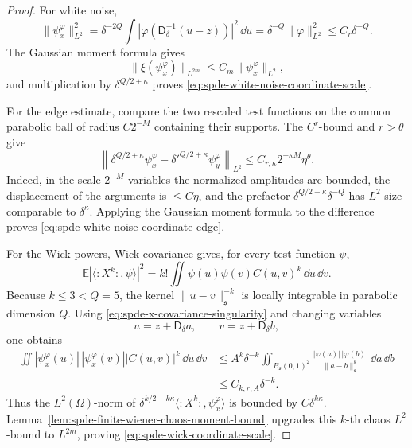 \begin{proof}
For white noise,
\[
  \|\psi_x^\varphi\|_{L^2}^2
  =
  \delta^{-2Q}\int
  \left|\varphi(\mathsf D_{\delta}^{-1}(u-z))\right|^2\,\dd u
  =
  \delta^{-Q}\|\varphi\|_{L^2}^2
  \leq C_r\delta^{-Q}.
\]
The Gaussian moment formula gives
\[
  \|\xi(\psi_x^\varphi)\|_{L^{2m}}
  \leq C_m\|\psi_x^\varphi\|_{L^2},
\]
and multiplication by \(\delta^{Q/2+\kappa}\) proves
\eqref{eq:spde-white-noise-coordinate-scale}.

For the edge estimate, compare the two rescaled test functions on the common
parabolic ball of radius \(C2^{-M}\) containing their supports.  The
\(C^r\)-bound and \(r>\theta\) give
\begin{equation}
  \left\|
    \delta^{Q/2+\kappa}\psi_x^\varphi
    -
    {\delta'}^{Q/2+\kappa}\psi_y^\varphi
  \right\|_{L^2}
  \leq
  C_{r,\kappa}2^{-\kappa M}\eta^\theta .
  \label{eq:spde-white-noise-edge-ltwo}
\end{equation}
Indeed, in the scale \(2^{-M}\) variables the normalized amplitudes are
bounded, the displacement of the arguments is \(\leq C\eta\), and the
prefactor \(\delta^{Q/2+\kappa}\delta^{-Q}\) has \(L^2\)-size comparable to
\(\delta^\kappa\).  Applying the Gaussian moment formula to the difference
proves \eqref{eq:spde-white-noise-coordinate-edge}.

For the Wick powers, Wick covariance gives, for every test function \(\psi\),
\begin{equation}
  \mathbb E
  \left|
    \langle :X^k:,\psi\rangle
  \right|^2
  =
  k!
  \iint
  \psi(u)\psi(v)C(u,v)^k\,\dd u\,\dd v .
  \label{eq:spde-wick-coordinate-covariance}
\end{equation}
Because \(k\leq3<Q=5\), the kernel
\(\|u-v\|_{\mathfrak s}^{-k}\) is locally integrable in parabolic dimension
\(Q\).  Using \eqref{eq:spde-x-covariance-singularity} and changing variables
\[
  u=z+\mathsf D_\delta a,\qquad v=z+\mathsf D_\delta b,
\]
one obtains
\begin{equation}
\begin{aligned}
  \iint
  |\psi_x^\varphi(u)|\,|\psi_x^\varphi(v)|
  |C(u,v)|^k\,\dd u\,\dd v
  &\leq
  A^k\delta^{-k}
  \iint_{B_{\mathfrak s}(0,1)^2}
  \frac{|\varphi(a)|\,|\varphi(b)|}
       {\|a-b\|_{\mathfrak s}^{k}}\,\dd a\,\dd b        \\
  &\leq
  C_{k,r,A}\delta^{-k}.
\end{aligned}
  \label{eq:spde-wick-coordinate-variance-scale}
\end{equation}
Thus the \(L^2(\Omega)\)-norm of
\(\delta^{k/2+k\kappa}\langle :X^k:,\psi_x^\varphi\rangle\) is bounded by
\(C\delta^{k\kappa}\).  Lemma~\ref{lem:spde-finite-wiener-chaos-moment-bound}
upgrades this \(k\)-th chaos \(L^2\)-bound to \(L^{2m}\), proving
\eqref{eq:spde-wick-coordinate-scale}.


\end{proof}
